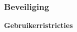 \documentclass{article}
\begin{document}





\subsubsection{Beveiliging}


\textbf{Gebruikerristricties}
\end{document}
